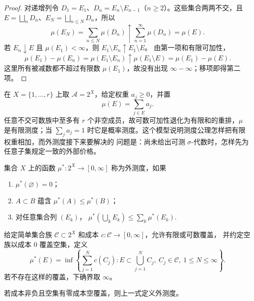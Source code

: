 \begin{proof}
对递增列令 $D_1=E_1$、$D_n=E_n\setminus E_{n-1}$（$n\ge2$）。这些集合两两不交，且
$E=\bigsqcup_nD_n$、$E_N=\bigsqcup_{n\le N}D_n$，所以
\[
 \mu(E_N)=\sum_{n\le N}\mu(D_n)
 \uparrow\sum_{n=1}^{\infty}\mu(D_n)=\mu(E).
\]
若 $E_n\downarrow E$ 且 $\mu(E_1)<\infty$，则 $E_1\setminus E_n\uparrow E_1\setminus E$。
由第一项和有限可加性，
\[
 \mu(E_1)-\mu(E_n)=\mu(E_1\setminus E_n)
 \uparrow\mu(E_1\setminus E)=\mu(E_1)-\mu(E).
\]
这里所有被减数都不超过有限数 $\mu(E_1)$，故没有出现 $\infty-\infty$；移项即得第二项。
\end{proof}

\begin{example}[有限原子上的直接核算]\label{ex:2-1-2-finite-measure}
在 $X=\{1,\ldots,r\}$ 上取 $\mathcal A=2^X$，给定权重 $a_j\ge0$，并置
\[
 \mu(E)=\sum_{j\in E}a_j.
\]
任意不交可数族中至多有 $r$ 个非空成员，故可数可加性退化为有限和的重排，$\mu$ 是有限测度；当
$\sum_ja_j=1$ 时它是概率测度。这个模型说明测度公理怎样把有限权重相加，而外测度接下来要解决的
问题是：尚未给出可测 $\sigma$-代数时，怎样先为任意子集规定一致的外部价格。
\end{example}

\begin{definition}[外测度]\label{def:2-1-2-1}
集合 $X$ 上的函数 $\mu^*:2^X\to[0,\infty]$ 称为外测度，如果
\begin{enumerate}
 \item $\mu^*(\varnothing)=0$；
 \item $A\subset B$ 蕴含 $\mu^*(A)\le\mu^*(B)$；
 \item 对任意集合列 $(E_k)$，
 \(
 \mu^*(\bigcup_kE_k)\le\sum_k\mu^*(E_k).
 \)
\end{enumerate}
\end{definition}

\begin{definition}[覆盖生成的外测度]\label{def:2-1-2-3}
给定简单集合族 $\mathcal C\subset2^X$ 和成本 $c:\mathcal C\to[0,\infty]$，允许有限或可数覆盖，
并约定空族以成本 $0$ 覆盖空集，定义
\[
 \mu^*(E)=\inf\left\{\sum_{j=1}^{N}c(C_j):
 E\subset\bigcup_{j=1}^{N}C_j,\ C_j\in\mathcal C,\ 1\le N\le\infty\right\}.
\]
若不存在这样的覆盖，下确界取 $\infty$。
\end{definition}

\begin{lemma}[覆盖下确界给出外测度]\label{lemma:2-1-2-1}
若成本非负且空集有零成本空覆盖，则上一式定义外测度。
\end{lemma}

